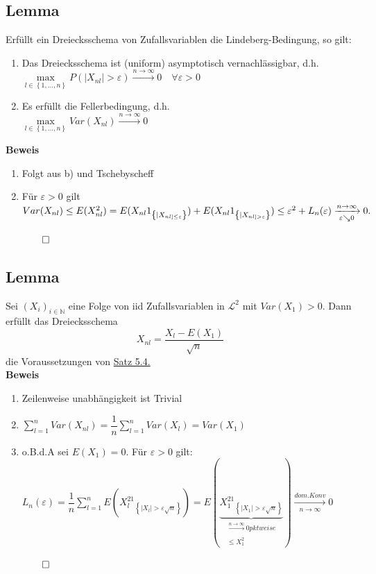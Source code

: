 \documentclass[german,10pt,oneside, fleqn, a4paper]{article}
\newcommand{\tscheb}{Tschebyscheff}
\newcommand {\N}	{\mathbb{N}}
\newcommand{\sm}[2][\infty]{\sum\limits_{#2}^{#1}}
\newcommand{\brc}[1]{\left(#1\right)}
\newcommand{\brac}[1]{\left\lbrace #1\right\rbrace}
\newcommand{\folge}[3][\N]{\left(#2_#3\right)_{#3\in #1}}
\newcommand{\QED}{\begin{flushright}$\qed$\end{flushright}}
\newcommand{\mc}[1]{\mathcal{#1}}
\newcommand{\lp}[1]{\mc{L}^{#1}}
\newcommand{\beweis}{\textbf{Beweis}\\}
\newcommand{\toinf}{\rightarrow\infty}
\newcommand{\1}[1]{1_{#1}}
\newcommand{\2}[1]{\1{\brac{#1}}}
\newcommand{\xr}[2][]{\xrightarrow[#1]{#2}}
\newcommand{\fe}{\forall\varepsilon>0}
\begin{document}
\subsection{Lemma}
\label{5.5}
Erfüllt ein Dreiecksschema von Zufallsvariablen die Lindeberg-Bedingung, so gilt:\begin{enumerate}[label=(\alph*)]
\item Das Dreiecksschema ist (uniform) asymptotisch vernachlässigbar, d.h.\\
$\max\limits_{l\in\brac{1,...,n}}P(|X_{nl}|>\varepsilon)\xr{n\toinf}0\quad \fe$
\item Es erfüllt die Fellerbedingung, d.h.\\
$\max\limits_{l\in\brac{1,...,n}}Var(X_{nl})\xr{n\toinf}0$	
\end{enumerate}
\beweis
\begin{enumerate}[label=(\alph*)]
\item Folgt aus b) und \tscheb
\item Für $\varepsilon>0$ gilt\\
$Var(X_{nl})\leq E(X_{nl}^2)=E(X_{nl}\1{\brac{|X_{nl]\leq\varepsilon}}})+E(X_{nl}\1{\brac{|X_{nl]>\varepsilon}}})\\
\leq \varepsilon^2+L_n(\varepsilon)\xr[\varepsilon\searrow0]{n\toinf}0.$\QED
\end{enumerate}

\subsection{Lemma}
\label{5.6}
Sei $\folge{X}{i}$ eine Folge von iid Zufallsvariablen in $\lp{2}$ mit $Var(X_1)>0$. Dann erfüllt das Dreiecksschema\\
\[X_{nl}=\dfrac{X_l-E(X_1)}{\sqrt{n}}\]
die Voraussetzungen von \hyperref[5.4]{Satz 5.4.}\\
\beweis
\begin{enumerate}[label=(\alph*)]
\item Zeilenweise unabhängigkeit ist Trivial
\item $\sm[n]{l=1}Var(X_{nl})=\dfrac{1}{n}\sm[n]{l=1}Var(X_l)=Var(X_1)$
\item o.B.d.A sei $E(X_1)=0$. Für $\varepsilon>0$ gilt:\\
$L_n(\varepsilon)=\dfrac{1}{n}\sm[n]{l=1}E\brc{X_l^2\1{\brac{|X_l|>\varepsilon\sqrt{n}}}}=E\brc{\underbrace{X_1^2\1{\brac{|X_1|>\varepsilon\sqrt{n}}}}_{\substack{\xr{n\toinf}0 pktweise\\ \leq X_1^2}}}\xr[n\toinf]{dom. Konv}0$\QED
\end{enumerate}
\end{document}
